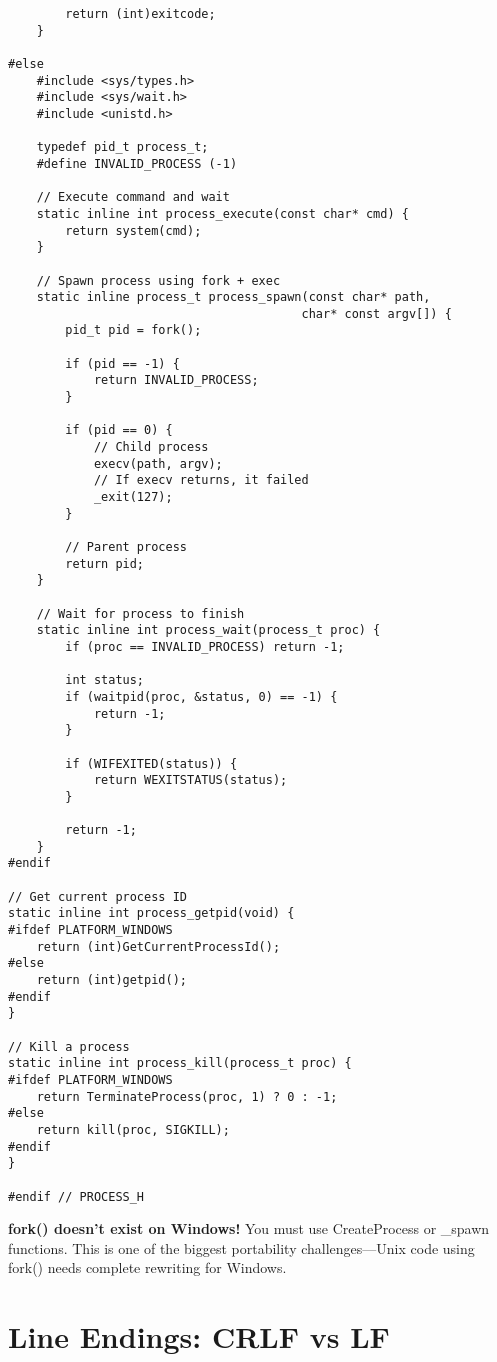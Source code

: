 \begin{lstlisting}
        return (int)exitcode;
    }

#else
    #include <sys/types.h>
    #include <sys/wait.h>
    #include <unistd.h>

    typedef pid_t process_t;
    #define INVALID_PROCESS (-1)

    // Execute command and wait
    static inline int process_execute(const char* cmd) {
        return system(cmd);
    }

    // Spawn process using fork + exec
    static inline process_t process_spawn(const char* path,
                                         char* const argv[]) {
        pid_t pid = fork();

        if (pid == -1) {
            return INVALID_PROCESS;
        }

        if (pid == 0) {
            // Child process
            execv(path, argv);
            // If execv returns, it failed
            _exit(127);
        }

        // Parent process
        return pid;
    }

    // Wait for process to finish
    static inline int process_wait(process_t proc) {
        if (proc == INVALID_PROCESS) return -1;

        int status;
        if (waitpid(proc, &status, 0) == -1) {
            return -1;
        }

        if (WIFEXITED(status)) {
            return WEXITSTATUS(status);
        }

        return -1;
    }
#endif

// Get current process ID
static inline int process_getpid(void) {
#ifdef PLATFORM_WINDOWS
    return (int)GetCurrentProcessId();
#else
    return (int)getpid();
#endif
}

// Kill a process
static inline int process_kill(process_t proc) {
#ifdef PLATFORM_WINDOWS
    return TerminateProcess(proc, 1) ? 0 : -1;
#else
    return kill(proc, SIGKILL);
#endif
}

#endif // PROCESS_H
\end{lstlisting}

\begin{warningbox}
\textbf{fork() doesn't exist on Windows!} You must use CreateProcess or \_spawn functions. This is one of the biggest portability challenges—Unix code using fork() needs complete rewriting for Windows.
\end{warningbox}

\section{Line Endings: CRLF vs LF}

